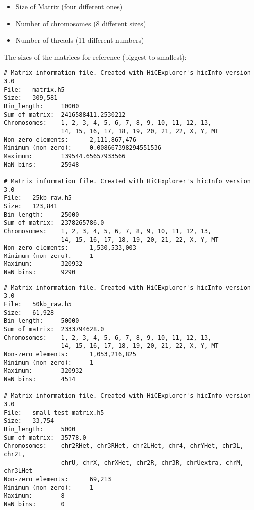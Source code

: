 \begin{itemize}
    \item Size of Matrix (four different ones)
    \item Number of chromosomes (8 different sizes)
    \item Number of threads (11 different numbers)
\end{itemize}


\newpage
The sizes of the matrices for reference (biggest to smallest):

\begin{verbatim}
# Matrix information file. Created with HiCExplorer's hicInfo version 3.0
File:   matrix.h5
Size:   309,581
Bin_length:     10000
Sum of matrix:  2416588411.2530212
Chromosomes:    1, 2, 3, 4, 5, 6, 7, 8, 9, 10, 11, 12, 13,
                14, 15, 16, 17, 18, 19, 20, 21, 22, X, Y, MT
Non-zero elements:      2,111,867,476
Minimum (non zero):     0.008667398294551536
Maximum:        139544.65657933566
NaN bins:       25948

# Matrix information file. Created with HiCExplorer's hicInfo version 3.0
File:   25kb_raw.h5
Size:   123,841
Bin_length:     25000
Sum of matrix:  2378265786.0
Chromosomes:    1, 2, 3, 4, 5, 6, 7, 8, 9, 10, 11, 12, 13,
                14, 15, 16, 17, 18, 19, 20, 21, 22, X, Y, MT
Non-zero elements:      1,530,533,003
Minimum (non zero):     1
Maximum:        320932
NaN bins:       9290
\end{verbatim}
\newpage
\begin{verbatim}
# Matrix information file. Created with HiCExplorer's hicInfo version 3.0
File:   50kb_raw.h5
Size:   61,928
Bin_length:     50000
Sum of matrix:  2333794628.0
Chromosomes:    1, 2, 3, 4, 5, 6, 7, 8, 9, 10, 11, 12, 13,
                14, 15, 16, 17, 18, 19, 20, 21, 22, X, Y, MT
Non-zero elements:      1,053,216,825
Minimum (non zero):     1
Maximum:        320932
NaN bins:       4514

# Matrix information file. Created with HiCExplorer's hicInfo version 3.0
File:   small_test_matrix.h5
Size:   33,754
Bin_length:     5000
Sum of matrix:  35778.0
Chromosomes:    chr2RHet, chr3RHet, chr2LHet, chr4, chrYHet, chr3L, chr2L,
                chrU, chrX, chrXHet, chr2R, chr3R, chrUextra, chrM, chr3LHet
Non-zero elements:      69,213
Minimum (non zero):     1
Maximum:        8
NaN bins:       0
\end{verbatim}


